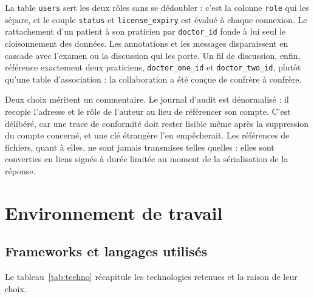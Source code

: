 La table \texttt{users} sert les deux rôles sans se dédoubler : c'est la colonne
\texttt{role} qui les sépare, et le couple \texttt{status} et \texttt{license\_expiry}
est évalué à chaque connexion. Le rattachement d'un patient à son praticien par
\texttt{doctor\_id} fonde à lui seul le cloisonnement des données. Les annotations et les
messages disparaissent en cascade avec l'examen ou la discussion qui les porte. Un fil de
discussion, enfin, référence exactement deux praticiens, \texttt{doctor\_one\_id} et
\texttt{doctor\_two\_id}, plutôt qu'une table d'association : la collaboration a été
conçue de confrère à confrère.

Deux choix méritent un commentaire. Le journal d'audit est dénormalisé : il
recopie l'adresse et le rôle de l'auteur au lieu de référencer son compte. C'est
délibéré, car une trace de conformité doit rester lisible même après la suppression du
compte concerné, et une clé étrangère l'en empêcherait. Les références de
fichiers, quant à elles, ne sont jamais transmises telles quelles : elles sont
converties en liens signés à durée limitée au moment de la sérialisation de la réponse.

\section{Environnement de travail}

\subsection{Frameworks et langages utilisés}

Le tableau~\ref{tab:techno} récapitule les technologies retenues et la raison de leur
choix.

